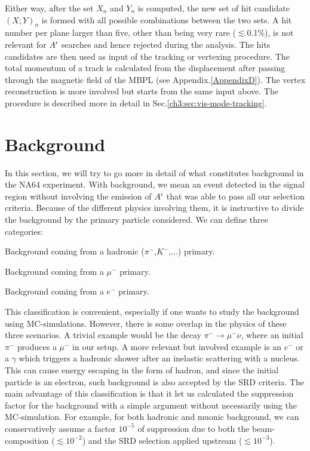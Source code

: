 Either way, after the set $X_n$ and $Y_n$ is computed, the new set of hit candidate $(X;Y)_n$ is formed with all possible combinations between the two sets. A hit number per plane larger than five, other than being very rare ($\lesssim$0.1\%), is not relevant for $A'$ searches and hence rejected during the analysis. The hits candidates are then used as input of the tracking or vertexing procedure. The total momentum of a track is calculated from the displacement after passing through the magnetic field of the MBPL (see Appendix.\ref{AppendixD}). The vertex reconstruction is more involved but starts from the same input above. The procedure is described more in detail in Sec.\ref{ch3:sec:vis-mode-tracking}.

\section{Background}
\label{ch3:sec:bkg}

In this section, we will try to go more in detail of what constitutes background in the NA64 experiment. With background, we mean an event detected in the signal region without involving the emission of $A'$ that was able to pass all our selection criteria. Because of the different physics involving them, it is instructive to divide the background by the primary particle considered. We can define three categories:

\begin{description}[leftmargin=!,labelwidth=\widthof{\bfseries Electronic background}]
\item[Hadronic background] Background coming from a hadronic ($\pi^-$,$K^-$,...) primary.
\item[Muonic background] Background coming from a $\mu^-$ primary.
\item[Electronic background] Background coming from a $e^-$ primary.
\end{description}

This classification is convenient, especially if one wants to study the background using MC-simulations. However, there is some overlap in the physics of these three scenarios. A trivial example would be the decay $\pi^- \rightarrow \mu^-\nu$, where an initial $\pi^-$ produces a $\mu^-$ in our setup. A more relevant but involved example is an $e^-$ or a $\gamma$ which triggers a hadronic shower after an inelastic scattering with a nucleus. This can cause energy escaping in the form of hadron, and since the initial particle is an electron, such background is also accepted by the SRD criteria. The main advantage of this classification is that it let us calculated the suppression factor for the background with a simple argument without necessarily using the MC-simulation. For example, for both hadronic and muonic background, we can conservatively assume a factor $10^{-5}$ of suppression due to both the beam-composition ($\lesssim 10^{-2}$) and the SRD selection applied upstream ($\lesssim 10^{-3}$).

